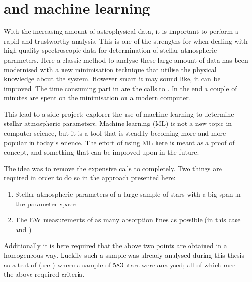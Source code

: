 \chapter{ and machine learning}
\label{cha:fasmaML}

With the increasing amount of astrophysical data, it is important to perform a rapid and trustworthy
analysis. This is one of the strengths for  when dealing with high quality spectroscopic
data for determination of stellar atmospheric parameters. Here a classic method to analyse these
large amount of data has been modernised with a new minimisation technique that utilise the physical
knowledge about the system. However smart it may sound like, it can be improved. The time consuming
part in  are the calls to . In the end a couple of minutes are spent on the
minimisation on a modern computer.

This lead to a side-project: explorer the use of machine learning to determine stellar atmospheric
parameters. Machine learning (ML) is not a new topic in computer science, but it is a tool that is
steadily becoming more and more popular in today's science. The effort of using ML here is meant as
a proof of concept, and something that can be improved upon in the future.

The idea was to remove the expensive calls to  completely. Two things are required in
order to do so in the approach presented here:
\begin{enumerate}
  \item Stellar atmospheric parameters of a large sample of stars with a big span in the parameter
        space
  \item The EW measurements of as many absorption lines as possible (in this case  and
        )
\end{enumerate}
Additionally it is here required that the above two points are obtained in a homogeneous way.
Luckily such a sample was already analysed during this thesis as a test of  (see
) where a sample of 583 stars were analysed; all of which meet the above
required criteria.

